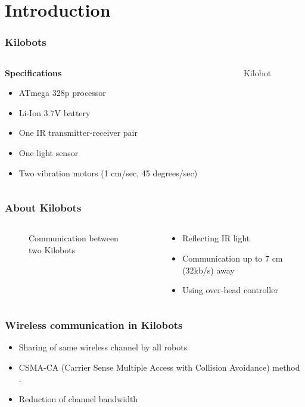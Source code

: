 \section{Introduction}
\begin{frame}
	\frametitle{Kilobots}
	\begin{columns}
		\begin{column}{0.5\textwidth}
			\textbf{Specifications}
			\vspace{0.2cm}
			\begin{itemize}
				\item ATmega 328p processor 
				\item Li-Ion 3.7V battery 
				\item One IR transmitter-receiver pair 
				\item One light sensor 
				\item Two vibration motors (1 cm/sec, 45 degrees/sec)
			\end{itemize}
		\end{column}
	\begin{column}{0.5\textwidth}
		\begin{figure}
			\centering
			\hspace{5cm}
			\caption{Kilobot}
		\end{figure}
	\end{column}
	\end{columns}
\end{frame}

\begin{frame}
	\frametitle{About Kilobots \cite{kilobotics_manual}}
	\begin{columns}
		\begin{column}{0.5\textwidth}
			\begin{figure}
				\centering
				\fbox{\texttt{[image: comm]}}
				\hspace{0.2cm}
				\caption{Communication between two Kilobots}
			\end{figure}
		\end{column}
		\begin{column}{0.5\textwidth}
			\begin{itemize}
				\item Reflecting IR light
				\item Communication up to 7 cm (32kb/s) away 
				\item Using over-head controller
			\end{itemize}
		\end{column}
	\end{columns}
\end{frame}

\begin{frame}
	\frametitle{Wireless communication in Kilobots}
	\begin{itemize}
		\item Sharing of same wireless channel by all robots
		\item CSMA-CA (Carrier Sense Multiple Access with Collision Avoidance) method \cite{WEBOPEDIA-csma-cd}.
		\item Reduction of channel bandwidth        
	\end{itemize}
\end{frame}
